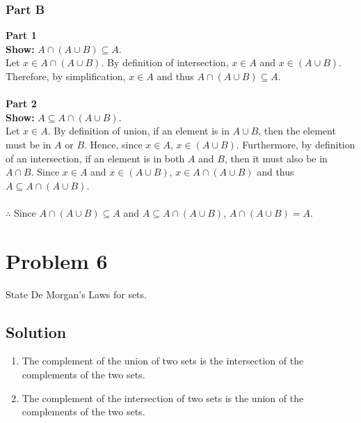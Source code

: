 \documentclass[table]{article}
\begin{document}
\subsubsection{Part B}
\textbf{Part 1}\\
\textbf{Show:} $A \cap (A \cup B) \subseteq A$.\\
Let $x \in A \cap (A \cup B)$. By definition of intersection, $x \in A$ and $x \in (A \cup B)$. Therefore, by simplification, $x \in A$ and thus $A \cap (A \cup B) \subseteq A$.\\~\\
\textbf{Part 2}\\
\textbf{Show:} $A \subseteq A \cap (A \cup B)$.\\
Let $x \in A$. By definition of union, if an element is in $A \cup B$, then the element must be in $A$ or $B$. Hence, since $x \in A$, $x \in (A \cup B)$. Furthermore, by definition of an intersection, if an element is in both $A$ and $B$, then it must also be in $A \cap B$. Since $x \in A$ and $x \in (A \cup B)$, $x \in A \cap (A \cup B)$ and thus $A \subseteq A \cap (A \cup B)$.\\~\\
$\therefore$ Since $A \cap (A \cup B) \subseteq A$ and $A \subseteq A \cap (A \cup B)$, $A \cap (A \cup B) = A$.
\section{Problem 6}
State De Morgan's Laws for sets.
\subsection{Solution}
\begin{enumerate}[nosep]
\item The complement of the union of two sets is the intersection of the complements of the two sets.
\item The complement of the intersection of two sets is the union of the complements of the two sets.
\end{enumerate}
\end{document}
